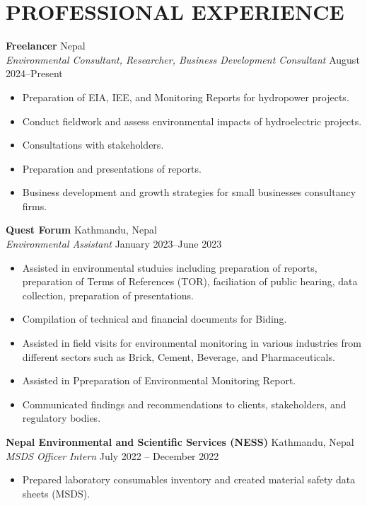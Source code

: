 \documentclass[a4paper, 11pt]{extarticle}
\begin{document}
\vspace{5pt}

\section*{PROFESSIONAL EXPERIENCE}
\noindent
\textbf{Freelancer} \hfill Nepal\\[2pt] 
\textit{Environmental Consultant, Researcher, Business Development Consultant} \hfill  August 2024--Present
\begin{itemize}
    \item Preparation of EIA, IEE, and Monitoring Reports for hydropower projects.
    \item Conduct fieldwork and assess environmental impacts of hydroelectric projects.
    \item Consultations with stakeholders.
    \item Preparation and presentations of reports.
    \item Business development and growth strategies for small businesses consultancy firms.
\end{itemize}

\noindent
\textbf{Quest Forum} \hfill Kathmandu, Nepal\\[2pt] 
\textit{Environmental Assistant} \hfill January 2023--June 2023
\begin{itemize}
    \item Assisted in environmental studuies including preparation of reports, preparation of Terms of References (TOR), faciliation of public hearing, data collection, preparation of presentations.
    \item Compilation of technical and financial documents for Biding.
    \item Assisted in field visits for environmental monitoring in various industries from different sectors such as Brick, Cement, Beverage, and Pharmaceuticals.
    \item Assisted in Ppreparation of Environmental Monitoring Report.
    \item Communicated findings and recommendations to clients, stakeholders, and regulatory bodies.
\end{itemize}

\noindent
\textbf{Nepal Environmental and Scientific Services (NESS)} \hfill Kathmandu, Nepal\\[2pt] 
\textit{MSDS Officer Intern} \hfill July 2022 -- December 2022
\begin{itemize}
    \item Prepared laboratory consumables inventory and created material safety data sheets (MSDS).
\end{itemize}
\end{document}
